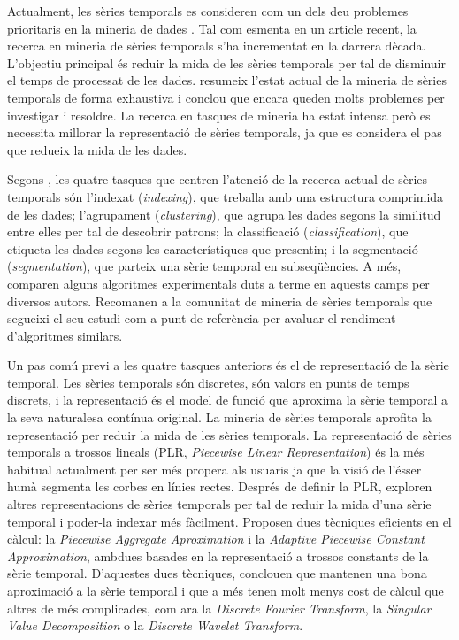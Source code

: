 Actualment, les sèries temporals es consideren com un dels deu problemes
prioritaris en la mineria de dades \parencite{yangwu06}. Tal com
esmenta \textcite{fu11} en un article recent, la recerca en mineria de
sèries temporals s'ha incrementat en la darrera dècada. L'objectiu
principal és reduir la mida de les sèries temporals per tal de
disminuir el temps de processat de les dades.  \citeauthor{fu11}
resumeix l'estat actual de la mineria de sèries temporals de forma
exhaustiva i conclou que encara queden molts problemes per investigar
i resoldre. La recerca en tasques de mineria ha estat intensa però es
necessita millorar la representació de sèries temporals, ja que es
considera el pas que redueix la mida de les dades.

Segons \textcite{keogh02}, les quatre tasques que centren l'atenció de
la recerca actual de sèries temporals són l'indexat (\emph{indexing}),
que treballa amb una estructura comprimida de les dades; l'agrupament
(\emph{clustering}), que agrupa les dades segons la similitud entre
elles per tal de descobrir patrons; la classificació
(\emph{classification}), que etiqueta les dades segons les
característiques que presentin; i la segmentació
(\emph{segmentation}), que parteix una sèrie temporal en
subseqüències.  A més, \citeauthor{keogh02} comparen alguns algoritmes
experimentals duts a terme en aquests camps per diversos
autors. Recomanen a la comunitat de mineria de sèries temporals que
segueixi el seu estudi com a punt de referència per avaluar el
rendiment d'algoritmes similars.

Un pas comú previ a les quatre tasques anteriors és el de representació de la sèrie temporal. Les sèries temporals són discretes, són valors en punts de temps discrets, i la representació és el model de funció que aproxima la sèrie temporal a la seva naturalesa contínua original. La mineria de sèries temporals aprofita la representació per reduir la mida de les sèries temporals.
La representació de sèries temporals a trossos lineals (PLR, \emph{Piecewise Linear Representation}) \parencite{keogh97,keogh98} {é}s la més habitual actualment per ser més propera als usuaris ja que la visió de l'ésser humà segmenta les corbes en línies rectes.
Després de definir la PLR, \textcite{keogh00,keogh01} exploren altres representacions de sèries temporals per tal de reduir la mida d'una sèrie temporal i poder-la indexar més fàcilment. Proposen dues tècniques eficients en el càlcul: la \emph{Piecewise Aggregate Aproximation} i la \emph{Adaptive Piecewise Constant Approximation}, ambdues basades en la representació a trossos constants de la sèrie temporal. 
D'aquestes dues tècniques, \citeauthor{keogh00,keogh01} conclouen que mantenen una bona aproximació a la sèrie temporal i que a més  tenen molt menys cost de càlcul que altres de més complicades, com ara la \emph{Discrete Fourier Transform},  la  \emph{Singular Value Decomposition} o la \emph{Discrete Wavelet Transform}.







